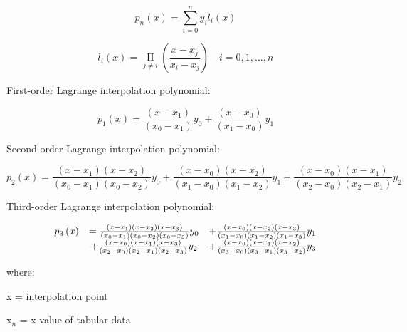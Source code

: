 \begin{equation}
{p_n}\left( x \right) = \sum\limits_{i = 0}^n {{y_i}{l_i}\left( x \right)}
\end{equation}

\begin{equation}
{l_i}\left( x \right) = \mathop \Pi \limits_{j \ne i} \left( {\frac{{x - {x_j}}}{{{x_i} - {x_j}}}} \right)\,\,\,\,\,\,i = 0,1,...,n
\end{equation}

First-order Lagrange interpolation polynomial:

\begin{equation}
{p_1}\left( x \right) = \frac{{\left( {x - {x_1}} \right)}}{{\left( {{x_0} - {x_1}} \right)}}{y_0} + \frac{{\left( {x - {x_0}} \right)}}{{\left( {{x_1} - {x_0}} \right)}}{y_1}
\end{equation}

Second-order Lagrange interpolation polynomial:

\begin{equation}
{p_2}\left( x \right) = \frac{{\left( {x - {x_1}} \right)\left( {x - {x_2}} \right)}}{{\left( {{x_0} - {x_1}} \right)\left( {{x_0} - {x_2}} \right)}}{y_0} + \frac{{\left( {x - {x_0}} \right)\left( {x - {x_2}} \right)}}{{\left( {{x_1} - {x_0}} \right)\left( {{x_1} - {x_2}} \right)}}{y_1} + \frac{{\left( {x - {x_0}} \right)\left( {x - {x_1}} \right)}}{{\left( {{x_2} - {x_0}} \right)\left( {{x_2} - {x_1}} \right)}}{y_2}
\end{equation}

Third-order Lagrange interpolation polynomial:

\begin{equation}
\begin{array}{ccc}
  p_3\left(x\right) &= \frac{\left(x-x_{1}\right)\left(x-x_{2}\right)\left(x-x_{3}\right)} {\left(x_{0}-x_{1}\right)\left(x_{0}-x_{2}\right)\left(x_{0}-x_{3}\right)} y_0
            &+ \frac{\left(x-x_{0}\right)\left(x-x_{2}\right)\left(x-x_{3}\right)} {\left(x_{1}-x_{0}\right)\left(x_{1}-x_{2}\right)\left(x_{1}-x_{3}\right)} y_1 \\
            &+ \frac{\left(x-x_{0}\right)\left(x-x_{1}\right)\left(x-x_{3}\right)} {\left(x_{2}-x_{0}\right)\left(x_{2}-x_{1}\right)\left(x_{2}-x_{3}\right)} y_2
            &+ \frac{\left(x-x_{0}\right)\left(x-x_{1}\right)\left(x-x_{2}\right)} {\left(x_{3}-x_{0}\right)\left(x_{3}-x_{1}\right)\left(x_{3}-x_{2}\right)} y_3
\end{array}
\end{equation}

where:

x = interpolation point

x\(_{n}\) = x value of tabular data

